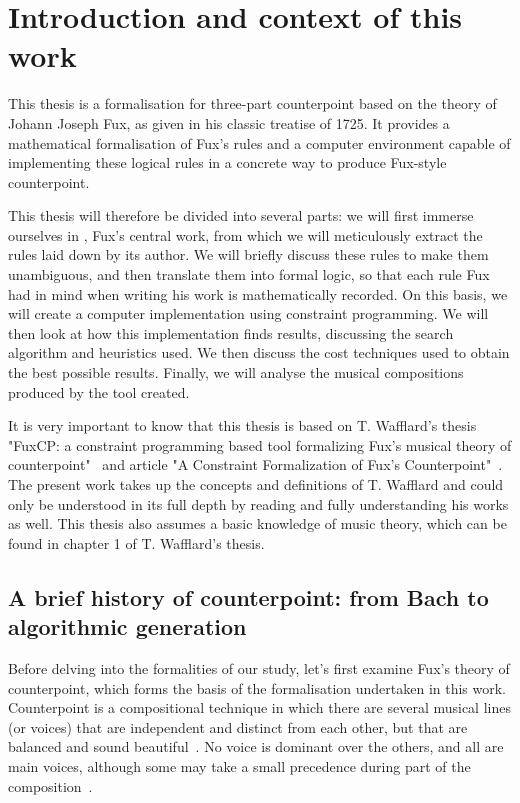 \chapter{Introduction and context of this work}
This thesis is a formalisation for three-part counterpoint based on the theory of Johann Joseph Fux, as given in his classic treatise of 1725. It provides a mathematical formalisation of Fux's rules and a computer environment capable of implementing these logical rules in a concrete way to produce Fux-style counterpoint.


This thesis will therefore be divided into several parts: we will first immerse ourselves in \gap, Fux's central work, from which we will meticulously extract the rules laid down by its author. We will briefly discuss these rules to make them unambiguous, and then translate them into formal logic, so that each rule Fux had in mind when writing his work is mathematically recorded. On this basis, we will create a computer implementation using constraint programming. We will then look at how this implementation finds results, discussing the search algorithm and heuristics used. We then discuss the cost techniques used to obtain the best possible results. Finally, we will analyse the musical compositions produced by the tool created.

It is very important to know that this thesis is based on T. Wafflard's thesis "FuxCP: a constraint programming based tool formalizing Fux's musical theory of counterpoint"~\cite{wafflard2023} and article "A Constraint Formalization of Fux's Counterpoint"~\cite{sprockeels2023constraint}. The present work takes up the concepts and definitions of T. Wafflard and could only be understood in its full depth by reading and fully understanding his works as well. This thesis also assumes a basic knowledge of music theory, which can be found in chapter 1 of T. Wafflard's thesis. %



\section{A brief history of counterpoint: from Bach to algorithmic generation}
Before delving into the formalities of our study, let's first examine Fux's theory of counterpoint, which forms the basis of the formalisation undertaken in this work. Counterpoint is a compositional technique in which there are several musical lines (or voices) that are independent and distinct from each other, but that are balanced and sound beautiful~\cite{CpSachs}. No voice is dominant over the others, and all are main voices, although some may take a small precedence during part of the composition~\cite{hess2016}.


